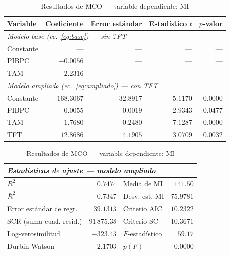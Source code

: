 \documentclass[12pt, letterpaper]{article}
\begin{document}
\begin{table}[ht]
\centering
\caption{Resultados de MCO — variable dependiente: MI}
\label{tab:resultados}
\small
\begin{tabular}{lrrrr}
\toprule
\textbf{Variable} & \textbf{Coeficiente} & \textbf{Error estándar}
                  & \textbf{Estadístico $t$} & \textbf{$p$-valor} \\
\midrule
\multicolumn{5}{l}{\textit{Modelo base (ec.~\ref{eq:base}) — sin TFT}} \\[2pt]
Constante   & ---        & ---       & ---        & ---    \\
PIBPC       & $-0.0056$  & ---       & ---        & ---    \\
TAM         & $-2.2316$  & ---       & ---        & ---    \\
\midrule
\multicolumn{5}{l}{\textit{Modelo ampliado (ec.~\ref{eq:ampliado}) — con TFT}} \\[2pt]
Constante   & $168.3067$ & $32.8917$ & $5.1170$  & $0.0000$ \\
PIBPC       & $-0.0055$  & $0.0019$  & $-2.9343$ & $0.0477$ \\
TAM         & $-1.7680$  & $0.2480$  & $-7.1287$ & $0.0000$ \\
TFT         & $12.8686$  & $4.1905$  & $3.0709$  & $0.0032$ \\
\bottomrule
\end{tabular}

\vspace{4pt}
\begin{tabular}{lr@{\quad}lr}
\toprule
\multicolumn{4}{l}{\textit{Estadísticas de ajuste — modelo ampliado}} \\
\midrule
$R^2$                     & $0.7474$ & Media de MI    & $141.50$  \\
$\bar{R}^2$               & $0.7347$ & Desv. est. MI  & $75.9781$ \\
Error estándar de regr.   & $39.1313$& Criterio AIC   & $10.2322$ \\
SCR (suma cuad. resid.)   & $91\,875.38$ & Criterio SC & $10.3671$ \\
Log-verosimilitud         & $-323.43$& $F$-estadístico& $59.17$   \\
Durbin-Watson             & $2.1703$ & $p(F)$         & $0.0000$  \\
\bottomrule
\end{tabular}
\end{table}

\end{document}
